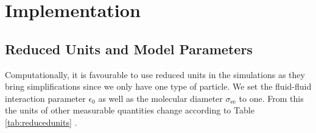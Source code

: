 \chapter{Implementation}
\label{chap:implementation}
\vspace{2cm}

\section{Reduced Units and Model Parameters}

Computationally, it is favourable to use reduced units in the simulations as they bring simplifications since we only have one type of particle. We set the fluid-fluid interaction parameter $\epsilon_0$ as well as the molecular diameter $\sigma_{\text{ee}}$ to one. From this the units of other measurable quantities change according to Table \ref{tab:reducedunits} \cite{allen1987computer }.

